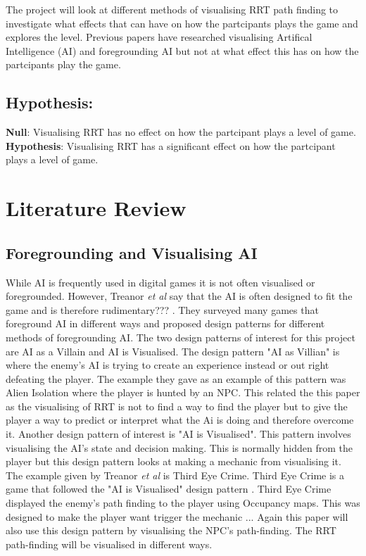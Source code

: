 \documentclass[journal]{IEEEtran}
\begin{document}
The project will look at different methods of visualising RRT path finding to investigate what effects that can have on how the partcipants plays the game and explores the level.  Previous papers have researched visualising Artifical Intelligence (AI) and foregrounding AI but not at what effect this has on how the partcipants play the game.


\subsection{Hypothesis:}
\textbf{Null}: Visualising RRT has no effect on how the partcipant plays a level of game. \\
\textbf{Hypothesis}: Visualising RRT has a significant effect on how the partcipant plays a level of game. 


\section{Literature Review}
\subsection{Foregrounding and Visualising AI}
While AI is frequently used in digital games it is not often visualised or foregrounded. However, Treanor \textit{et al} say that the AI is often designed to fit the game and is therefore rudimentary??? \cite{treanor2015}.
They surveyed many games that foreground AI in different ways and proposed design patterns for different methods of foregrounding AI. The two design patterns of interest for this project are AI as a Villain and AI is Visualised. The design pattern "AI as Villian" is where the enemy's AI is trying to create an experience instead or out right defeating the player. The example they gave as an example of this pattern was Alien Isolation where the player is hunted by an NPC.  This related the this paper as the visualising of RRT is not to find a way to find the player but to give the player a way to predict or interpret what the Ai is doing and therefore overcome it.
Another design pattern of interest is "AI is Visualised". This pattern involves visualising the AI's state and decision making. This is normally hidden from the player but this design pattern looks at making a mechanic from visualising it. The example given by Treanor \textit{et al} is Third Eye Crime.  Third Eye Crime is a game that followed the "AI is Visualised" design pattern \cite{Isla2014}.  Third Eye Crime displayed the enemy's path finding to the player using Occupancy maps.  
This was designed to make the player want trigger the mechanic ...  Again this paper will also use this design pattern by visualising the NPC's path-finding.  The RRT path-finding will be visualised in different ways.
\end{document}
